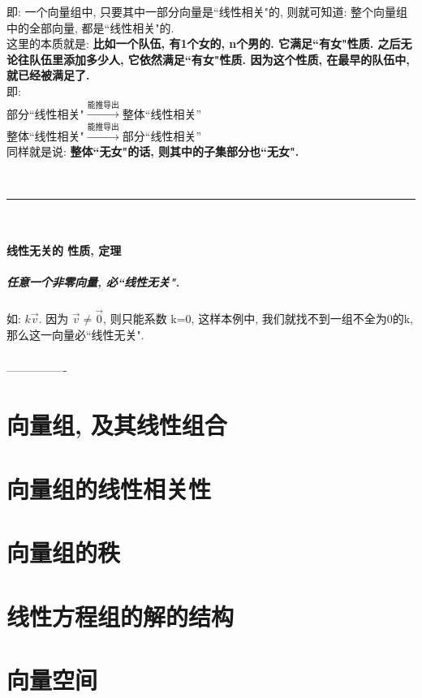 \documentclass[UTF8]{ctexart}
\begin{document}
即: 一个向量组中, 只要其中一部分向量是``线性相关"的, 则就可知道: 整个向量组中的全部向量, 都是``线性相关"的.\\

这里的本质就是: \textbf{比如一个队伍, 有1个女的, n个男的. 它满足``有女"性质. 之后无论往队伍里添加多少人, 它依然满足``有女"性质. 因为这个性质, 在最早的队伍中, 就已经被满足了.}\\


即:\\
部分``线性相关"$\overset{\text{能推导出}}{\rightarrow}$整体``线性相关'' \\
整体``线性相关"$\overset{\text{能推导出}}{\rightarrow}$部分``线性相关'' \\

同样就是说: \textbf{整体``无女"的话, 则其中的子集部分也``无女".}






~\\
\hrule
~\\

\subsection{线性无关的 性质, 定理}


\subsubsection{任意一个非零向量, 必``线性无关".}

如: $k\vec{v}$. 因为 $\vec{v} \ne \vec{0}$, 则只能系数 k=0, 这样本例中, 我们就找不到一组不全为0的k, 那么这一向量必``线性无关".


\subsubsection{}














----------------

\part{向量组, 及其线性组合}

\part{向量组的线性相关性}

\part{向量组的秩}

\part{线性方程组的解的结构}

\part{向量空间}
\end{document}
